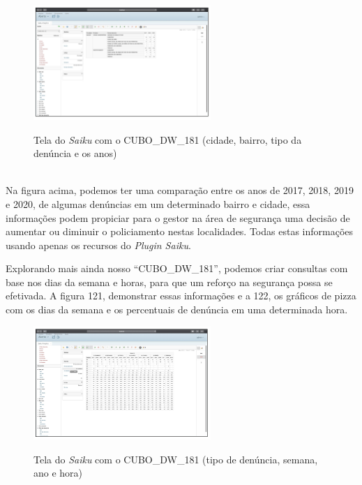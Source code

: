 \begin{figure}[H]
	\vspace*{0,2cm}
    \centering
    \caption{Tela do \textit{Saiku} com o CUBO\_DW\_181 (cidade, bairro, tipo da denúncia e os anos)}
    \includegraphics[width=0.6\textwidth]{./04-figuras/figura-saiku-cbta}
    \label{fig:ilustfigscbta}
\end{figure}
\vspace*{-0,9cm}
{\raggedright {}} \\

Na figura acima, podemos ter uma compara\c{c}\~{a}o entre os anos de 2017, 2018, 2019 e 2020, de algumas denúncias em um determinado bairro e cidade, essa informa\c{c}\~{o}es podem propiciar para o gestor na \'{a}rea de seguran\c{c}a uma decis\~{a}o de aumentar ou diminuir o policiamento nestas localidades. Todas estas informa\c{c}\~{o}es usando apenas os recursos do \textit{Plugin Saiku}.

Explorando mais ainda nosso ``CUBO\_DW\_181'', podemos criar consultas com base nos dias da semana e horas, para que um refor\c{c}o na seguran\c{c}a possa se efetivada. A figura 121, demonstrar essas informa\c{c}\~{o}es e a 122, os gr\'{a}ficos de pizza com os dias da semana e os percentuais de denúncia em uma determinada hora.


\begin{figure}[H]
	\vspace*{0,2cm}
    \centering
    \caption{Tela do \textit{Saiku} com o CUBO\_DW\_181 (tipo de denúncia, semana, ano e hora)}
    \includegraphics[width=0.6\textwidth]{./04-figuras/figura-saiku-tipo-semana-ano-hora}
    \label{fig:ilustfigstsah}
\end{figure}
\vspace*{-0,9cm}
{\raggedright {}} \\



